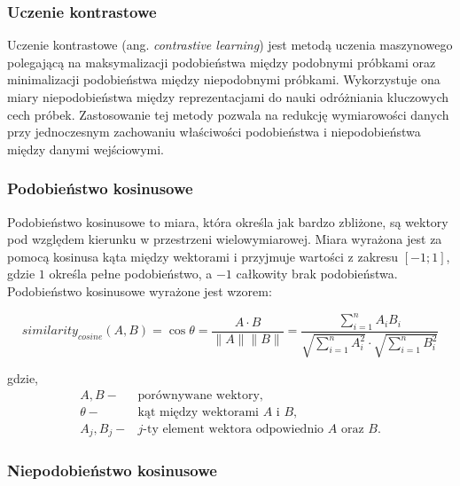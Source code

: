         \subsubsection{Uczenie kontrastowe}
            
            Uczenie kontrastowe (ang. \textit{contrastive learning})\cite{Bromley1993} jest metodą uczenia maszynowego polegającą na maksymalizacji podobieństwa między podobnymi próbkami oraz minimalizacji podobieństwa między niepodobnymi próbkami. Wykorzystuje ona miary niepodobieństwa między reprezentacjami do nauki odróżniania kluczowych cech próbek. Zastosowanie tej metody pozwala na redukcję wymiarowości danych przy jednoczesnym zachowaniu właściwości podobieństwa i niepodobieństwa między danymi wejściowymi.

        \subsubsection{Podobieństwo kosinusowe}

            Podobieństwo kosinusowe to miara, która określa jak bardzo zbliżone, są wektory pod względem kierunku w przestrzeni wielowymiarowej. Miara wyrażona jest za pomocą kosinusa kąta między wektorami i przyjmuje wartości z zakresu $[-1; 1]$, gdzie $1$ określa pełne podobieństwo, a $-1$ całkowity brak podobieństwa. Podobieństwo kosinusowe wyrażone jest wzorem:

            \begin{equation}
                similarity_{cosine}(A, B) = \cos{\theta} = \frac{A \cdot B}{\|A\| \|B\|} = \frac{
                    \sum^{n}_{i = 1}A_i B_i
                }{
                    \sqrt{
                        \sum^{n}_{i = 1}A_i^2
                    }
                    \cdot
                    \sqrt{
                        \sum^{n}_{i = 1}B_i^2
                    }
                }
            \end{equation}

            gdzie,
            \begin{align*}
                A, B -& \text{porównywane wektory,} \\
                \theta -& \text{kąt między wektorami $A$ i $B$,} \\
                A_j, B_j -& \text{$j$-ty element wektora odpowiednio $A$ oraz $B$.}
            \end{align*}

        \subsubsection{Niepodobieństwo kosinusowe}

